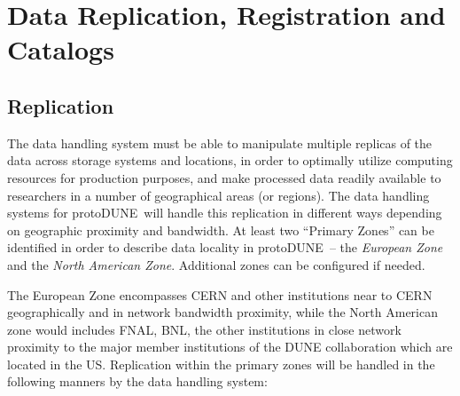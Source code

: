 \documentclass[pdftex,12pt,letter]{article}
\newcommand{\pd}{protoDUNE\ }
\begin{document}
\section{Data Replication, Registration and Catalogs}
\subsection{Replication}
\label{sec:replication}
The data handling system must be able to manipulate multiple replicas of the data across storage systems and locations, in order
to optimally utilize computing resources for production purposes, and make processed data readily available to researchers in
a number of geographical areas (or regions).
The data handling systems for \pd will handle this replication in different ways
depending on geographic proximity and bandwidth.  At least two ``Primary Zones'' can be identified in order
to describe data locality in \pd -- the \textit{European Zone} and the \textit{North American Zone}.
Additional zones can be configured if needed.

The European Zone encompasses CERN and other institutions near to CERN geographically and in network bandwidth proximity,
while the North American zone would includes  FNAL, BNL, the other institutions
in close network proximity to the major member institutions of the DUNE collaboration which are located in the US.
Replication within the primary zones will be handled in the following manners by the data handling system:
\end{document}
